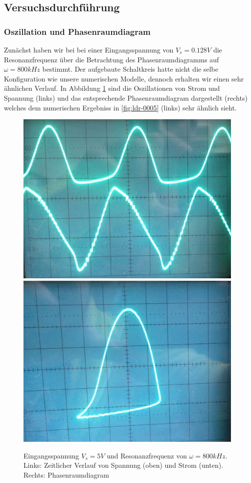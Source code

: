 \documentclass{scrartcl}
\begin{document}
\subsection { Versuchsdurchführung }
\subsubsection { Oszillation und Phasenraumdiagram }
Zunächst haben wir bei bei einer Eingangsspannung von $V_s=0.128V$ die Resonanzfrequenz über die Betrachtung des Phasenraumdiagramms auf $\omega=800kHz$ bestimmt. 
Der aufgebaute Schaltkreis hatte nicht die selbe Konfiguration wie unsere numerischen Modelle, dennoch erhalten wir einen sehr ähnlichen Verlauf. In Abbildung \ref{fig:ldr-real1} sind die Oszillationen von Strom und Spannung (links) und das entsprechende Phasenraumdiagram dargestellt (rechts) welches dem numerischen Ergebniss in \ref{fig:ldr-0005} (links) sehr ähnlich sieht. 
\begin{figure}[!htbp]
\centering
\includegraphics[scale=0.1]{800khz-5V-oszi}
\includegraphics[scale=0.11]{800khz-5V-phase}
\caption{Eingangsspannung $V_s=5V$ und Resonanzfrequenz von $\omega=800kHz$. Links: Zeitlicher Verlauf von Spannung (oben) und Strom (unten). Rechts: Phasenraumdiagram}
\label{fig:ldr-real1}
\end{figure}
\end{document}
